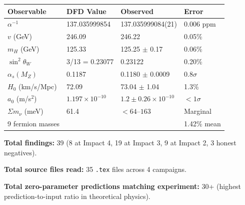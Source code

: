 \documentclass[11pt,a4paper]{article}
\begin{document}
\begin{longtable}{@{}p{4.5cm}p{3.5cm}p{3cm}p{2cm}@{}}
\toprule
\textbf{Observable} & \textbf{DFD Value} & \textbf{Observed} & \textbf{Error} \\
\midrule
$\alpha^{-1}$ & 137.035999854 & 137.035999084(21) & 0.006 ppm \\
$v$ (GeV) & 246.09 & 246.22 & 0.05\% \\
$m_H$ (GeV) & 125.33 & 125.25 $\pm$ 0.17 & 0.06\% \\
$\sin^2\theta_W$ & 3/13 = 0.23077 & 0.23122 & 0.20\% \\
$\alpha_s(M_Z)$ & 0.1187 & 0.1180 $\pm$ 0.0009 & 0.8$\sigma$ \\
$H_0$ (km/s/Mpc) & 72.09 & 73.04 $\pm$ 1.04 & 1.3\% \\
$a_0$ (m/s$^2$) & $1.197 \times 10^{-10}$ & $1.2 \pm 0.26 \times 10^{-10}$ & $< 1\sigma$ \\
$\Sigma m_\nu$ (meV) & 61.4 & $< 64$--$163$ & Marginal \\
9 fermion masses & & & 1.42\% mean \\
\bottomrule
\end{longtable}

\bigskip
\noindent
\textbf{Total findings:} 39 (8 at Impact 4, 19 at Impact 3, 9 at Impact 2, 3 honest negatives).

\bigskip
\noindent
\textbf{Total source files read:} 35 \texttt{.tex} files across 4 campaigns.

\bigskip
\noindent
\textbf{Total zero-parameter predictions matching experiment:} 30+
(highest prediction-to-input ratio in theoretical physics).
\end{document}
